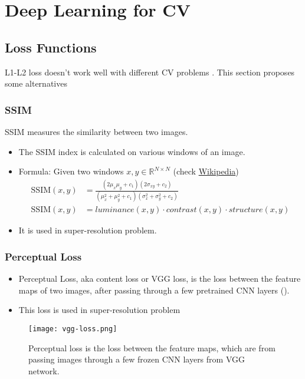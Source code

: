 \chapter{Deep Learning for CV}
\todo{}

\section{Loss Functions}
L1-L2 loss doesn't work well with different \ac{CV} problems \cite{wang2009mean}. This section proposes some alternatives

\subsection{SSIM}
\ac{SSIM} measures the similarity between two images. \cite{wang2004image}
\begin{itemize}
	\item The \ac{SSIM} index is calculated on various windows of an image.
	\item Formula: Given two windows $x, y \in \mathbb{R}^{N \times N}$ (check \href{https://en.wikipedia.org/wiki/Structural_similarity}{Wikipedia})
	\begin{align}
		\text{SSIM}(x,y) &= \frac{(2\mu_x \mu_y + c_1) (2\sigma_{xy} + c_2)}{(\mu_x^2 + \mu_y^2 + c_1) (\sigma_x^2 + \sigma_y^2 + c_2)}\\
		\text{SSIM}(x,y) &= luminance(x,y) \cdot contrast(x,y) \cdot structure(x,y)
	\end{align}
	\item It is used in super-resolution problem.
\end{itemize}

\subsection{Perceptual Loss}
\label{subsec:perceptual-loss}
\begin{itemize}
	\item Perceptual Loss, \ac{aka} content loss or VGG loss, is the loss between the feature maps of two images, after passing through a few pretrained \ac{CNN} layers ().
	\item This loss is used in super-resolution problem
\end{itemize}

\begin{figure}[hbt!]
	\centering
	\texttt{[image: vgg-loss.png]}
	\caption{Perceptual loss is the loss between the feature maps, which are from passing images through a few frozen \ac{CNN} layers from VGG network.}
	\label{fig:vgg-loss}
\end{figure}

